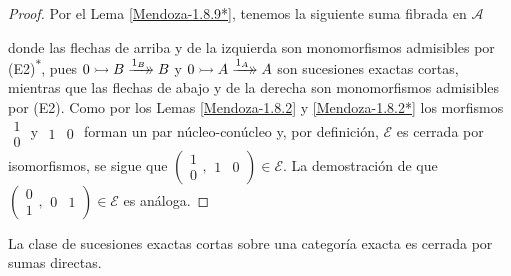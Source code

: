 \documentclass[tesis]{subfiles}
\begin{document}
\begin{proof}
    Por el Lema \ref{Mendoza-1.8.9*}, tenemos la siguiente suma fibrada en $\mathscr{A}$
    \begin{center}
    \end{center}
    donde las flechas de arriba y de la izquierda son monomorfismos admisibles por (E2)\textsuperscript{$\ast$}, pues $0\rightarrowtail B\xrightarrow[]{1_B}\mathrel{\mkern-14mu}\rightarrow B$ y $0\rightarrowtail A\xrightarrow[]{1_A}\mathrel{\mkern-14mu}\rightarrow A$ son sucesiones exactas cortas, mientras que las flechas de abajo y de la derecha son monomorfismos admisibles por (E2). Como por los Lemas \ref{Mendoza-1.8.2} y \ref{Mendoza-1.8.2*} los morfismos $\begin{smallmatrix} 1 \\ 0 \end{smallmatrix}$ y $\begin{smallmatrix} 1 & 0 \end{smallmatrix}$ forman un par núcleo-conúcleo y, por definición, $\mathscr{E}$ es cerrada por isomorfismos, se sigue que $(\begin{smallmatrix} 1 \\ 0 \end{smallmatrix},\begin{smallmatrix} 1 & 0 \end{smallmatrix})\in\mathscr{E}$. La demostración de que $(\begin{smallmatrix} 0 \\ 1 \end{smallmatrix},\begin{smallmatrix} 0 & 1 \end{smallmatrix})\in\mathscr{E}$ es análoga.
\end{proof}

\begin{Prop}\label{Bühler-2.9}
    La clase de sucesiones exactas cortas sobre una categoría exacta es cerrada por sumas directas. %
\end{Prop}
\end{document}

